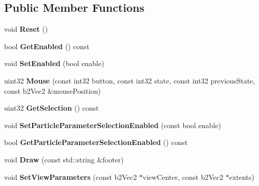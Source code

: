 \subsection*{Public Member Functions}
\begin{DoxyCompactItemize}
\item 
\hypertarget{classFullscreenUI_a23260fc8601b7d8464ba609bc7115c1e}{void {\bfseries Reset} ()}\label{classFullscreenUI_a23260fc8601b7d8464ba609bc7115c1e}

\item 
\hypertarget{classFullscreenUI_a2096cdee1a068b504960244c4f2630c2}{bool {\bfseries Get\-Enabled} () const }\label{classFullscreenUI_a2096cdee1a068b504960244c4f2630c2}

\item 
\hypertarget{classFullscreenUI_a64c42ffa75c048a86e540362a58c6abc}{void {\bfseries Set\-Enabled} (bool enable)}\label{classFullscreenUI_a64c42ffa75c048a86e540362a58c6abc}

\item 
\hypertarget{classFullscreenUI_a4f7bc7dc03447c32338e5c47f0581793}{uint32 {\bfseries Mouse} (const int32 button, const int32 state, const int32 previous\-State, const b2\-Vec2 \&mouse\-Position)}\label{classFullscreenUI_a4f7bc7dc03447c32338e5c47f0581793}

\item 
\hypertarget{classFullscreenUI_ae8f4d06960f95c0383466e646398c142}{uint32 {\bfseries Get\-Selection} () const }\label{classFullscreenUI_ae8f4d06960f95c0383466e646398c142}

\item 
\hypertarget{classFullscreenUI_aed3f3f1e94f8b67f0bc665daa206b06a}{void {\bfseries Set\-Particle\-Parameter\-Selection\-Enabled} (const bool enable)}\label{classFullscreenUI_aed3f3f1e94f8b67f0bc665daa206b06a}

\item 
\hypertarget{classFullscreenUI_a158f8f45f150d36f6132ff10cc3b949f}{bool {\bfseries Get\-Particle\-Parameter\-Selection\-Enabled} () const }\label{classFullscreenUI_a158f8f45f150d36f6132ff10cc3b949f}

\item 
\hypertarget{classFullscreenUI_af44522cd5d4c3a3131cf013bd3daafe2}{void {\bfseries Draw} (const std\-::string \&footer)}\label{classFullscreenUI_af44522cd5d4c3a3131cf013bd3daafe2}

\item 
\hypertarget{classFullscreenUI_a03cb7469a09fe47a5f72c0202616a8f0}{void {\bfseries Set\-View\-Parameters} (const b2\-Vec2 $\ast$view\-Center, const b2\-Vec2 $\ast$extents)}\label{classFullscreenUI_a03cb7469a09fe47a5f72c0202616a8f0}

\end{DoxyCompactItemize}


